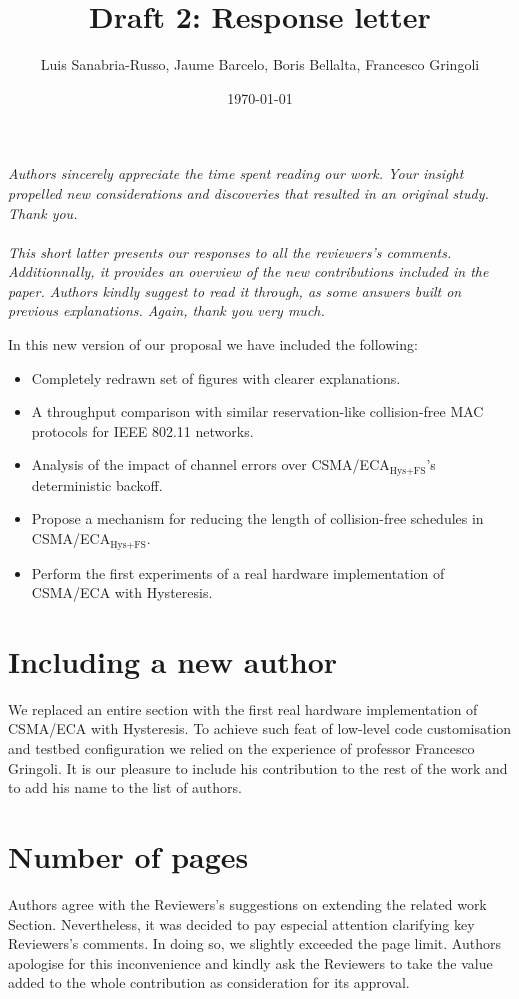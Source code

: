 \documentclass[]{article}
\begin{document}
\title{Draft 2: Response letter}
  \author{Luis Sanabria-Russo, Jaume Barcelo, Boris Bellalta, Francesco Gringoli}

\date{\today}
\maketitle
\emph{Authors sincerely appreciate the time spent reading our work. Your insight propelled new considerations and discoveries that resulted in an original study. Thank you. \\\\This short latter presents our responses to all the reviewers's comments. Additionnally, it provides an overview of the new contributions included in the paper. Authors kindly suggest to read it through, as some answers built on previous explanations. Again, thank you very much.\\}

In this new version of our proposal we have included the following:
\begin{itemize}
	\item Completely redrawn set of figures with clearer explanations.
	\item A throughput comparison with similar reservation-like collision-free MAC protocols for IEEE 802.11 networks.
	\item Analysis of the impact of channel errors over CSMA/ECA$_{\text{Hys+FS}}$'s deterministic backoff.
	\item Propose a mechanism for reducing the length of collision-free schedules in CSMA/ECA$_{\text{Hys+FS}}$.
	\item Perform the first experiments of a real hardware implementation of CSMA/ECA with Hysteresis.
\end{itemize}

\section*{Including a new author}
We replaced an entire section with the first real hardware implementation of CSMA/ECA with Hysteresis. To achieve such feat of low-level code customisation and testbed configuration we relied on the experience of professor Francesco Gringoli. It is our pleasure to include his contribution to the rest of the work and to add his name to the list of authors.

\section*{Number of pages}
Authors agree with the Reviewers's suggestions on extending the related work Section. Nevertheless, it was decided to pay especial attention clarifying key Reviewers's comments. In doing so, we slightly exceeded the page limit. Authors apologise for this inconvenience and kindly ask the Reviewers to take the value added to the whole contribution as consideration for its approval.
\end{document}
